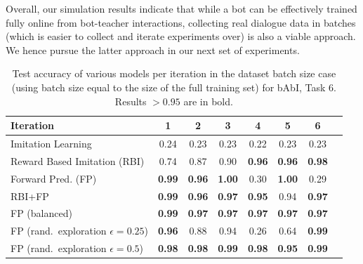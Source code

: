 Overall, our simulation
 results indicate that while a bot can be effectively trained fully online from bot-teacher interactions,
collecting real dialogue data in batches (which is easier to collect and iterate experiments over) is also a viable approach. We hence pursue the latter approach in our next set of experiments.



\begin{table}[!tbh]
\center
\begin{tabular}{lccccccc}\toprule
Iteration  &     1     & 2     & 3     & 4     & 5     & 6 \\
\midrule
Imitation Learning               & 0.24  & 0.23  & 0.23 & 0.22 & 0.23 & 0.23 \\
Reward Based Imitation (RBI)     & 0.74  & 0.87  & 0.90 & {\bf 0.96} & {\bf 0.96} & {\bf 0.98}  \\
Forward Pred. (FP)               & {\bf 0.99}  & {\bf 0.96}  & {\bf 1.00} & 0.30 & {\bf 1.00} & 0.29  \\
RBI+FP                           & {\bf 0.99}  & {\bf 0.96}  &  {\bf 0.97} & {\bf 0.95} & 0.94 & {\bf 0.97} \\
FP (balanced)                    & {\bf 0.99} & {\bf 0.97} & {\bf 0.97} & {\bf 0.97} & {\bf 0.97} & {\bf 0.97} \\
FP (rand.\ exploration $\epsilon=0.25$)                & {\bf {\bf 0.96}} & 0.88 & 0.94 & 0.26 & 0.64 & {\bf 0.99} \\
FP (rand.\ exploration $\epsilon=0.5$)                 & {\bf 0.98} & {\bf 0.98} & {\bf 0.99} & {\bf 0.98} & {\bf 0.95} & {\bf 0.99} \\\bottomrule
\end{tabular}
\caption[Test accuracy of various models per iteration in the dataset batch size case]{Test accuracy of various models per iteration in the dataset batch size case
(using batch size equal to the size of the full training set) for bAbI, Task $6$.
 Results $>0.95$ are in bold.
\label{table:dataset-batch-babi}
}
\end{table}


